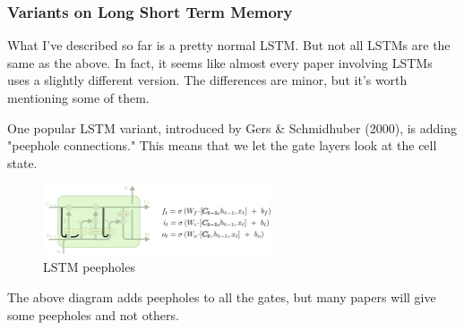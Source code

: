 {\subsubsection{Variants on Long Short Term Memory}
What I’ve described so far is a pretty normal LSTM. But not all LSTMs are the same as the above. In fact, it seems like almost every paper involving LSTMs uses a slightly different version. The differences are minor, but it’s worth mentioning some of them.

One popular LSTM variant, introduced by Gers \& Schmidhuber (2000), is adding "peephole connections." This means that we let the gate layers look at the cell state.
\renewcommand{\figurename}{Abb.}
\begin{figure}[htp]
\centering
\includegraphics[width=0.60\textwidth]{pictures/LSTM3-var-peepholes.png}
\caption[LSTM peepholes]{LSTM peepholes\protect\footnotemark}
\end{figure}
The above diagram adds peepholes to all the gates, but many papers will give some peepholes and not others.

}
